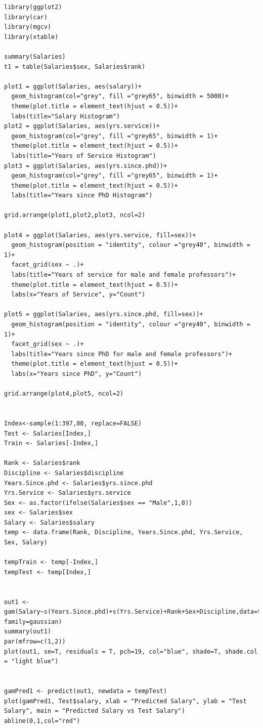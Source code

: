 \documentclass{article}
\begin{document}
\begin{verbatim}
library(ggplot2)
library(car)
library(mgcv)
library(xtable)

summary(Salaries)
t1 = table(Salaries$sex, Salaries$rank)

plot1 = ggplot(Salaries, aes(salary))+
  geom_histogram(col="grey", fill ="grey65", binwidth = 5000)+
  theme(plot.title = element_text(hjust = 0.5))+
  labs(title="Salary Histogram")
plot2 = ggplot(Salaries, aes(yrs.service))+
  geom_histogram(col="grey", fill ="grey65", binwidth = 1)+
  theme(plot.title = element_text(hjust = 0.5))+
  labs(title="Years of Service Histogram")
plot3 = ggplot(Salaries, aes(yrs.since.phd))+
  geom_histogram(col="grey", fill ="grey65", binwidth = 1)+
  theme(plot.title = element_text(hjust = 0.5))+
  labs(title="Years since PhD Histogram")

grid.arrange(plot1,plot2,plot3, ncol=2)

plot4 = ggplot(Salaries, aes(yrs.service, fill=sex))+
  geom_histogram(position = "identity", colour ="grey40", binwidth = 1)+
  facet_grid(sex ~ .)+
  labs(title="Years of service for male and female professors")+
  theme(plot.title = element_text(hjust = 0.5))+
  labs(x="Years of Service", y="Count")

plot5 = ggplot(Salaries, aes(yrs.since.phd, fill=sex))+
  geom_histogram(position = "identity", colour ="grey40", binwidth = 1)+
  facet_grid(sex ~ .)+
  labs(title="Years since PhD for male and female professors")+
  theme(plot.title = element_text(hjust = 0.5))+
  labs(x="Years since PhD", y="Count")

grid.arrange(plot4,plot5, ncol=2)


Index<-sample(1:397,80, replace=FALSE)
Test <- Salaries[Index,]
Train <- Salaries[-Index,]

Rank <- Salaries$rank
Discipline <- Salaries$discipline
Years.Since.phd <- Salaries$yrs.since.phd
Yrs.Service <- Salaries$yrs.service
Sex <- as.factor(ifelse(Salaries$sex == "Male",1,0))
sex <- Salaries$sex
Salary <- Salaries$salary
temp <- data.frame(Rank, Discipline, Years.Since.phd, Yrs.Service, Sex, Salary)

tempTrain <- temp[-Index,]
tempTest <- temp[Index,]


out1 <- gam(Salary~s(Years.Since.phd)+s(Yrs.Service)+Rank+Sex+Discipline,data=tempTrain, family=gaussian)
summary(out1)
par(mfrow=c(1,2))
plot(out1, se=T, residuals = T, pch=19, col="blue", shade=T, shade.col = "light blue")


gamPred1 <- predict(out1, newdata = tempTest)
plot(gamPred1, Test$salary, xlab = "Predicted Salary", ylab = "Test Salary", main = "Predicted Salary vs Test Salary")
abline(0,1,col="red")
\end{verbatim}
\end{document}
